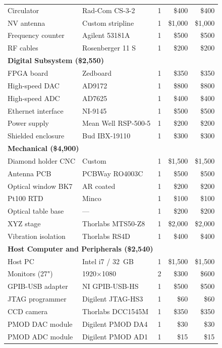 \documentclass[11pt,a4paper,openany]{book}
\begin{document}
\begin{longtable}{p{4.2cm}lrrr}
Circulator & Rad-Com CS-3-2 & 1 & \$400 & \$400 \\
NV antenna & Custom stripline & 1 & \$1,000 & \$1,000 \\
Frequency counter & Agilent 53181A & 1 & \$500 & \$500 \\
RF cables & Rosenberger 11 S & 1 & \$200 & \$200 \\
\midrule
\multicolumn{5}{l}{\textbf{Digital Subsystem (\$2,550)}} \\
\midrule
FPGA board & Zedboard & 1 & \$350 & \$350 \\
High-speed DAC & AD9172 & 1 & \$800 & \$800 \\
High-speed ADC & AD7625 & 1 & \$400 & \$400 \\
Ethernet interface & NI-9145 & 1 & \$500 & \$500 \\
Power supply & Mean Well RSP-500-5 & 1 & \$200 & \$200 \\
Shielded enclosure & Bud IBX-19110 & 1 & \$300 & \$300 \\
\midrule
\multicolumn{5}{l}{\textbf{Mechanical (\$4,900)}} \\
\midrule
Diamond holder CNC & Custom & 1 & \$1,500 & \$1,500 \\
Antenna PCB & PCBWay RO4003C & 1 & \$500 & \$500 \\
Optical window BK7 & AR coated & 1 & \$200 & \$200 \\
Pt100 RTD & Minco & 1 & \$100 & \$100 \\
Optical table base & --- & 1 & \$200 & \$200 \\
XYZ stage & Thorlabs MTS50-Z8 & 1 & \$2,000 & \$2,000 \\
Vibration isolation & Thorlabs RS4D & 1 & \$400 & \$400 \\
\midrule
\multicolumn{5}{l}{\textbf{Host Computer and Peripherals (\$2,540)}} \\
\midrule
Host PC & Intel i7 / 32~GB & 1 & \$1,500 & \$1,500 \\
Monitors (27") & 1920$\times$1080 & 2 & \$300 & \$600 \\
GPIB-USB adapter & NI GPIB-USB-HS & 1 & \$500 & \$500 \\
JTAG programmer & Digilent JTAG-HS3 & 1 & \$60 & \$60 \\
CCD camera & Thorlabs DCC1545M & 1 & \$350 & \$350 \\
PMOD DAC module & Digilent PMOD DA4 & 1 & \$30 & \$30 \\
PMOD ADC module & Digilent PMOD AD1 & 1 & \$15 & \$15 \\

\end{longtable}
\end{document}
